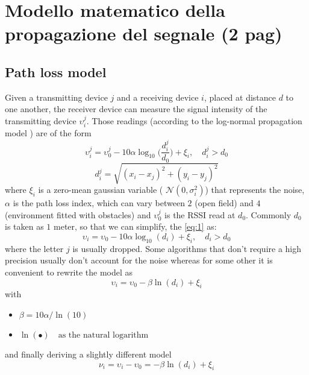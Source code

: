 \documentclass[12pt,twoside]{report}
\begin{document}
\clearpage

\chapter{Modello matematico della propagazione del segnale (2 pag)}
\section{Path loss model}
Given a transmitting device $j$ and a receiving device $i$, placed at distance $d$ to one another, the receiver device can measure the signal intensity of the transmitting device $\upsilon_i^j$. Those readings (according to the log-normal propagation model  \cite{MUNOZ200923}) are of the form
\begin{equation}
\upsilon_i^j = \upsilon_0^j-10\alpha\log_{10}\bigg(\frac{d_i^j}{d_0}\bigg) + \xi_i, \quad d_i^j>d_0
\label{eq:1}
\end{equation}
\begin{equation}
    d_i^j=\sqrt{(x_i-x_j)^2+(y_i-y_j)^2}
\end{equation}
where $\xi_i$ is a zero-mean gaussian variable ( $\mathcal{N}(0,\sigma^2_i)$) that represents the noise, $\alpha$ is the path loss index, which can vary between $2$ (open field) and $4$ (environment fitted with obstacles) and $\upsilon_0^j$ is the RSSI read at $d_0$. Commonly $d_0$ is taken as $1$ meter, so that we can simplify, the \ref{eq:1} as:
\begin{equation}
\upsilon_i = \upsilon_0-10\alpha\log_{10}(d_i) + \xi_i, \quad d_i>d_0
\label{eq:2}
\end{equation}
where the letter $j$ is usually dropped.
Some algorithms that don't require a high precision usually don't account for the noise whereas for some other it is convenient to rewrite the model as
\begin{equation}
\upsilon_i= \upsilon_0-\beta\ln(d_i) + \xi_i
\end{equation}
with
\begin{itemize}
    \item $\beta=10\alpha/\ln(10)$
    \item $\ln(\bullet)\quad \text{as the natural logarithm}$
\end{itemize}
and finally deriving a slightly different model
\begin{equation}
\nu_i = \upsilon_i-\upsilon_0= -\beta\ln(d_i) + \xi_i
\label{eq:5}
\end{equation}
\clearpage
\end{document}
